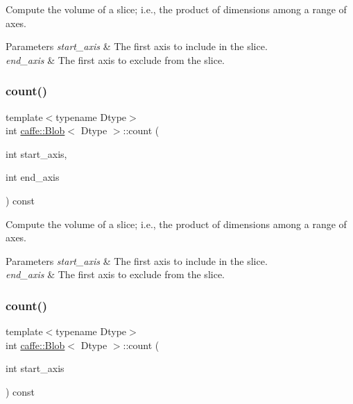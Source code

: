 Compute the volume of a slice; i.\+e., the product of dimensions among a range of axes. 


\begin{DoxyParams}{Parameters}
{\em start\+\_\+axis} & The first axis to include in the slice.\\
\hline
{\em end\+\_\+axis} & The first axis to exclude from the slice. \\
\hline
\end{DoxyParams}
\mbox{\label{classcaffe_1_1_blob_a8674686a97c961b309b4420ead6626b5}} 
\subsubsection{\texorpdfstring{count()}{count()}\hspace{0.1cm}{\footnotesize\ttfamily [2/4]}}
{\footnotesize\ttfamily template$<$typename Dtype$>$ \\
int \mbox{\hyperlink{classcaffe_1_1_blob}{caffe\+::\+Blob}}$<$ Dtype $>$\+::count (\begin{DoxyParamCaption}\item[{int}]{start\+\_\+axis,  }\item[{int}]{end\+\_\+axis }\end{DoxyParamCaption}) const\hspace{0.3cm}{\ttfamily [inline]}}



Compute the volume of a slice; i.\+e., the product of dimensions among a range of axes. 


\begin{DoxyParams}{Parameters}
{\em start\+\_\+axis} & The first axis to include in the slice.\\
\hline
{\em end\+\_\+axis} & The first axis to exclude from the slice. \\
\hline
\end{DoxyParams}
\mbox{\label{classcaffe_1_1_blob_aab573b2a70c26bf3b2ae65e42706003e}} 
\subsubsection{\texorpdfstring{count()}{count()}\hspace{0.1cm}{\footnotesize\ttfamily [3/4]}}
{\footnotesize\ttfamily template$<$typename Dtype$>$ \\
int \mbox{\hyperlink{classcaffe_1_1_blob}{caffe\+::\+Blob}}$<$ Dtype $>$\+::count (\begin{DoxyParamCaption}\item[{int}]{start\+\_\+axis }\end{DoxyParamCaption}) const\hspace{0.3cm}{\ttfamily [inline]}}



